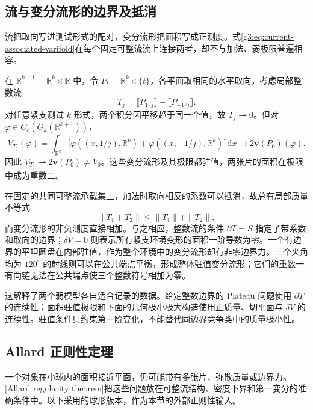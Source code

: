 \subsection{流与变分流形的边界及抵消}
\label{g3:subsec:2304:04}
流把取向写进测试形式的配对，变分流形把面积写成正测度。式\eqref{g3:eq:current-associated-varifold}在每个固定可整流流上连接两者，却不与加法、弱极限普遍相容。

\begin{example}\label{g3:exm:opposite-sheets-varifold-limit}
	在 \(\mathbb R^{k+1}=\mathbb R^k\times\mathbb R\) 中，令 \(P_t=\mathbb R^k\times\{t\}\)，各平面取相同的水平取向，考虑局部整数流
	\[
		T_j=\lBrack P_{1/j}\rBrack-\lBrack P_{-1/j}\rBrack.
	\]
	对任意紧支测试 \(k\) 形式，两个积分因平移趋于同一个值，故 \(T_j\rightharpoonup0\)。但对 \(\varphi\in C_c(G_k(\mathbb R^{k+1}))\)，
	\[
		V_{T_j}(\varphi)=\int_{\mathbb R^k}
		\bigl[\varphi((x,1/j),\mathbb R^k)+\varphi((x,-1/j),\mathbb R^k)\bigr]\,\mathrm dx
		\longrightarrow2\mathbf v(P_0)(\varphi).
	\]
	因此 \(V_{T_j}\rightharpoonup2\mathbf v(P_0)\ne V_0\)。这些变分流形及其极限都驻值，两张片的面积在极限中成为重数二。
\end{example}

在固定的共同可整流承载集上，加法时取向相反的系数可以抵消，故总有局部质量不等式
\[
	\|T_1+T_2\|\le\|T_1\|+\|T_2\|,
\]
而变分流形的非负测度直接相加。与之相应，整数流的条件 \(\partial T=S\) 指定了带系数和取向的边界；\(\delta V=0\) 则表示所有紧支环境变形的面积一阶导数为零。一个有边界的平坦圆盘在内部驻值，作为整个环境中的变分流形却有非零边界力。三个夹角均为 \(120^\circ\) 的射线则可以在公共端点平衡，形成整体驻值变分流形；它们的重数一有向链无法在公共端点使三个整数符号相加为零。

\ProseParagraphBreak
这解释了两个弱模型各自适合记录的数据。给定整数边界的 Plateau 问题使用 \(\partial T\) 的连续性；面积驻值极限和下面的几何极小极大构造使用正质量、切平面与 \(\delta V\) 的连续性。驻值条件只约束第一阶变化，不能替代同边界竞争类中的质量极小性。

\subsection{Allard 正则性定理}
\label{g3:subsec:2304:05}
一个对象在小球内的面积接近平面，仍可能带有多张片、弥散质量或边界力。[Allard regularity theorem]把这些问题放在可整流结构、密度下界和第一变分的准确条件中。以下采用\cite[第24节，假设24.1与定理24.2，第125--128页]{Simon1983}的球形版本，作为本节的外部正则性输入。

